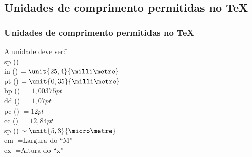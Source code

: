 \documentclass[handout,10pt]{beamer}
\begin{document}
\subsection{Unidades de comprimento permitidas no \TeX}
\begin{frame}[label=comprimentos]
	\frametitle{Unidades de comprimento permitidas no \TeX}

	\begin{tabbing}
		A unidade deve ser: \=\milli\metre \+\\
		                      sp () \=\kill
		                      \centi\metre \\
		                      in ()         \>\(=\unit{25,4}{\milli\metre}\) \\
		                      pt ()        \>\(=\unit{0,35}{\milli\metre}\) \\		                        
		                      bp ()    \>\(=\unit{1,00375}{pt}\) \\
		                      dd ()  \>\(=\unit{1,07}{pt}\) \\
		                      pc ()         \>\(=\unit{12}{pt}\) \\
		                      cc ()       \>\(=\unit{12,84}{pt}\) \\
		                      sp () \>\(\sim\unit{5,3}{\micro\metre}\) \\
		                      em                          \>\(=\text{Largura do ``M''}\) \\
		                      ex                          \>\(=\text{Altura do ``x''}\) \\
	\end{tabbing}
\end{frame}
\end{document}
